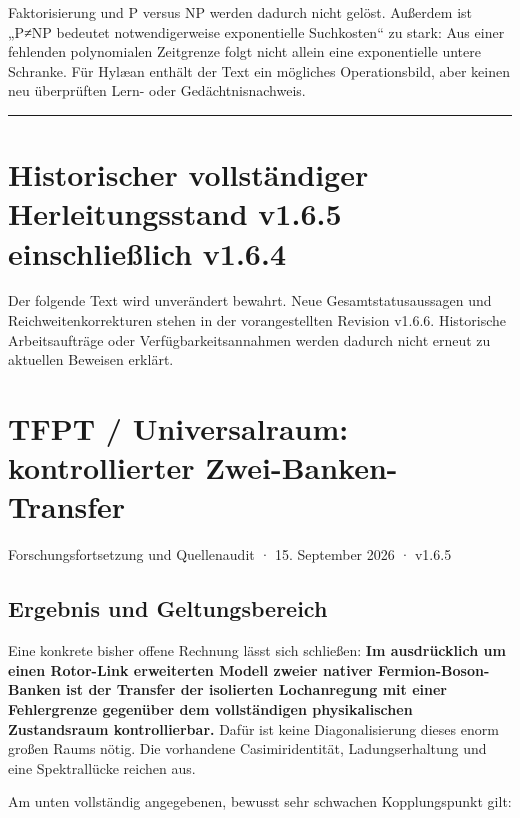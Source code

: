Faktorisierung und P versus NP werden dadurch nicht gelöst. Außerdem ist
„P≠NP bedeutet notwendigerweise exponentielle Suchkosten`` zu stark: Aus
einer fehlenden polynomialen Zeitgrenze folgt nicht allein eine
exponentielle untere Schranke. Für Hylæan enthält der Text ein mögliches
Operationsbild, aber keinen neu überprüften Lern- oder
Gedächtnisnachweis.

\begin{center}\rule{0.5\linewidth}{0.5pt}\end{center}

\section{Historischer vollständiger Herleitungsstand v1.6.5
einschließlich
v1.6.4}\label{historischer-vollstuxe4ndiger-herleitungsstand-v1.6.5-einschlieuxdflich-v1.6.4}

Der folgende Text wird unverändert bewahrt. Neue Gesamtstatusaussagen
und Reichweitenkorrekturen stehen in der vorangestellten Revision
v1.6.6. Historische Arbeitsaufträge oder Verfügbarkeitsannahmen werden
dadurch nicht erneut zu aktuellen Beweisen erklärt.

\section{TFPT / Universalraum: kontrollierter
Zwei-Banken-Transfer}\label{tfpt-universalraum-kontrollierter-zwei-banken-transfer}

Forschungsfortsetzung und Quellenaudit · 15. September 2026 · v1.6.5

\subsection{Ergebnis und
Geltungsbereich}\label{ergebnis-und-geltungsbereich}

Eine konkrete bisher offene Rechnung lässt sich schließen: \textbf{Im
ausdrücklich um einen Rotor-Link erweiterten Modell zweier nativer
Fermion-Boson-Banken ist der Transfer der isolierten Lochanregung mit
einer Fehlergrenze gegenüber dem vollständigen physikalischen
Zustandsraum kontrollierbar.} Dafür ist keine Diagonalisierung dieses
enorm großen Raums nötig. Die vorhandene Casimiridentität,
Ladungserhaltung und eine Spektrallücke reichen aus.

Am unten vollständig angegebenen, bewusst sehr schwachen Kopplungspunkt
gilt:

